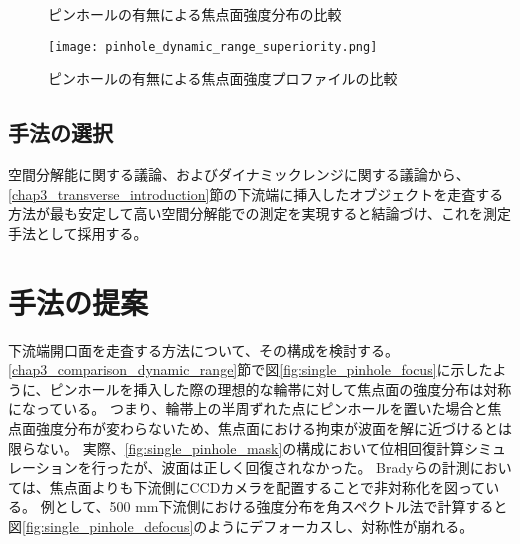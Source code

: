 \begin{figure}[!ht]
\centering


\caption[]{ピンホールの有無による焦点面強度分布の比較}
\label{fig:comparison_focus_pinhole_existence}
\end{figure}

\begin{figure}[!ht]
\centering
\texttt{[image: pinhole\_dynamic\_range\_superiority.png]}
\caption{ピンホールの有無による焦点面強度プロファイルの比較}
\label{fig:transverse_dynamic_range_superiority}
\end{figure}

\subsection{手法の選択}
\label{chap3_decision_of_method}
空間分解能に関する議論、およびダイナミックレンジに関する議論から、\ref{chap3_transverse_introduction}節の下流端に挿入したオブジェクトを走査する方法が最も安定して高い空間分解能での測定を実現すると結論づけ、これを測定手法として採用する。

\clearpage
\newpage

\section{手法の提案}
\label{chap3_transverse_arrangement}

下流端開口面を走査する方法について、その構成を検討する。
\ref{chap3_comparison_dynamic_range}節で図\ref{fig:single_pinhole_focus}に示したように、ピンホールを挿入した際の理想的な輪帯に対して焦点面の強度分布は対称になっている。
つまり、輪帯上の半周ずれた点にピンホールを置いた場合と焦点面強度分布が変わらないため、焦点面における拘束が波面を解に近づけるとは限らない。
実際、\ref{fig:single_pinhole_mask}の構成において位相回復計算シミュレーションを行ったが、波面は正しく回復されなかった。
Bradyらの計測においては、焦点面よりも下流側にCCDカメラを配置することで非対称化を図っている。\cite{Brady2009}
例として、500 mm下流側における強度分布を角スペクトル法で計算すると図\ref{fig:single_pinhole_defocus}のようにデフォーカスし、対称性が崩れる。

